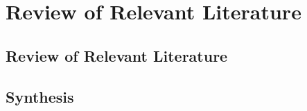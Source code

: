 \documentclass[../../1_thesis]{subfiles}
\begin{document}
\chapter{Review of Relevant Literature}

\section{Review of Relevant Literature}

\section{Synthesis}
\end{document}
